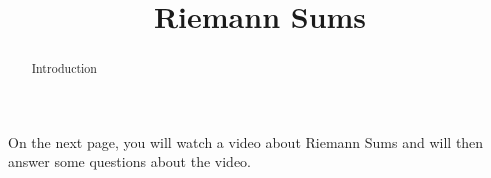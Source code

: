 \documentclass[handout]{ximera}
\title{Riemann Sums}
\begin{document}
\begin{abstract} Introduction %
\end{abstract}

\maketitle

On the next page, you will watch a video about Riemann Sums and will then answer some questions about the video.
\end{document}
